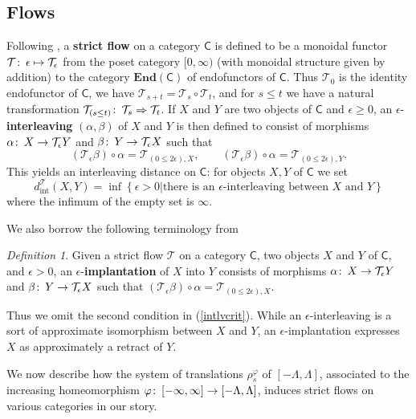 \documentclass[11pt]{amsart}
\theoremstyle{definition}
\theoremstyle{remark}
\newtheorem{dfn}[theorem]{Definition}
\numberwithin{equation}{section}
\def\co{\colon\thinspace}
\def\ep{\epsilon}
\begin{document}
\subsection{Flows}
Following \cite{dSMS}, a \textbf{strict flow} on a category $\mathsf{C}$ is defined to be a monoidal functor $\mathcal{T}\co\ep\mapsto \mathcal{T}_{\ep}$ from the poset category $[0,\infty)$ (with monoidal structure given by addition) to the category $\mathbf{End}(\mathsf{C})$ of endofunctors of $\mathsf{C}$.  Thus $\mathcal{T}_0$ is the identity endofunctor of $\mathsf{C}$, we have $\mathcal{T}_{s+t}=\mathcal{T}_s\circ\mathcal{T}_t$, and for $s\leq t$ we have a natural transformation $\mathcal{T}_{(s\leq t)}\co \mathcal{T}_s\Rightarrow \mathcal{T}_t$.  If $X$ and $Y$ are two objects of $\mathsf{C}$ and $\ep\geq 0$, an $\ep$-\textbf{interleaving} $(\alpha,\beta)$ of $X$ and $Y$ is then defined to consist of morphisms $\alpha\co X\to \mathcal{T}_{\ep}Y$ and $\beta\co Y\to \mathcal{T}_{\ep}X$ such that \begin{equation}\label{intlvcrit} (\mathcal{T}_{\ep}\beta)\circ \alpha=\mathcal{T}_{(0\leq 2\ep),X},\qquad (\mathcal{T}_{\ep}\beta)\circ \alpha=\mathcal{T}_{(0\leq 2\ep),Y}.\end{equation}
This yields an interleaving distance on $\mathsf{C}$: for objects $X,Y$ of $\mathsf{C}$ we set \begin{equation}\label{intergen} d_{\mathrm{int}}^{\mathcal{T}}(X,Y)=\inf\left\{\ep >0|\mbox{there is an $\ep$-interleaving between $X$ and $Y$}\right\}\end{equation} where the infimum of the empty set is $\infty$.

We also borrow the following terminology from \cite{U22}

\begin{dfn}\label{implantdfn}
	Given a strict flow $\mathcal{T}$ on a category $\mathsf{C}$, two objects $X$ and $Y$ of $\mathsf{C}$, and $\ep>0$, an $\ep$-\textbf{implantation} of $X$ into $Y$ consists of morphisms $\alpha\co X\to\mathcal{T}_{\ep}Y$ and $\beta\co Y\to \mathcal{T}_\ep X$ such that $(\mathcal{T}_{\ep}\beta)\circ\alpha=\mathcal{T}_{(0\leq 2\ep),X}$.
\end{dfn}

Thus we omit the second condition in (\ref{intlvcrit}).  While an $\ep$-interleaving is a sort of approximate isomorphism between $X$ and $Y$, an $\ep$-implantation expresses $X$ as approximately a retract of $Y$.

We now describe how the system of translations $\rho_{s}^{\varphi}$ of $[-\Lambda,\Lambda]$, associated to the increasing homeomorphism $\varphi\co [-\infty,\infty]\to [-\Lambda,\Lambda]$, induces strict flows on various categories in our story.  
\end{document}
